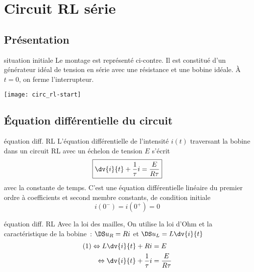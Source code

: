 \documentclass[../main/main.tex]{subfiles}
\begin{document}
\section{Circuit RL série}
\subsection{Présentation}
\begin{defi}[label=def:echelonL, sidebyside]{situation initiale}
    Le montage est représenté ci-contre. Il est constitué d'un générateur idéal
    de tension en série avec une résistance et une bobine idéale. À $t=0$, on
    ferme l'interrupteur.
    \tcblower
    \begin{center}
        \texttt{[image: circ\_rl-start]}
    \end{center}
\end{defi}

\subsection{Équation différentielle du circuit}
\begin{tcbraster}[raster columns=2, raster equal height=rows]
    \begin{prop}[label=prop:eqdiffrc]{équation diff. RL}
        L'équation différentielle de l'intensité $i(t)$ traversant la bobine
        dans un circuit RL avec un échelon de tension $E$ s'écrit
        \[ \boxed{\dv{i}{t} + \frac{1}{\tau}i = \frac{E}{R\tau}}\]
        avec  la constante de temps.
        \tcblower
        C'est une équation différentielle linéaire du premier ordre à
        coefficients et second membre constants, de condition initiale
        \[ \boxed{i(0^-) = i(0^+) = 0}\]
    \end{prop}
    \begin{demo}[label=demo:eqdiffrc]{équation diff. RL}
        Avec la loi des mailles,\smallbreak
        \linebreak
        On utilise la loi d'Ohm et la caractéristique de la bobine~:
        $\DS u_R = Ri$ et $\DS u_L = L \dv{i}{t}$
        \begin{align*}
            (1) \Leftrightarrow L\dv{i}{t} + Ri         & = E\\
            \Leftrightarrow \dv{i}{t} + \frac{1}{\tau}i & = \frac{E}{R\tau}
        \end{align*}
    \end{demo}
\end{tcbraster}
\end{document}
